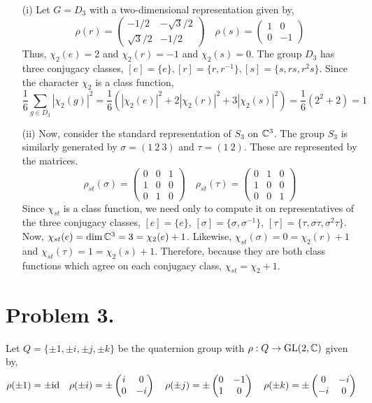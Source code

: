 \documentclass[12pt]{extarticle}
\begin{document}
\begin{enumerate}
\item[(i)] Let $G = D_3$ with a two-dimensional representation given by,
\[ \rho(r) = 
\begin{pmatrix}
-1/2 & -\sqrt{3}/2 \\
\sqrt{3}/2 & -1/2
\end{pmatrix} 
\quad 
\rho(s) = 
\begin{pmatrix}
1 & 0 \\
0 & -1
\end{pmatrix} 
\]
Thus, $\chi_2(e) = 2$ and $\chi_2(r) = -1$ and $\chi_2(s) = 0$.
The group $D_3$ has three conjugacy classes, $[e] = \{e\}, [r] = \{r, r^{-1}\}, [s] = \{s, rs, r^2 s\}$. Since the character $\chi_2$ is a class function,
\[ \frac{1}{6} \sum_{g \in D_3} |\chi_2(g)|^2 = \frac{1}{6} \left( |\chi_2(e)|^2 + 2 |\chi_2(r)|^2 + 3 |\chi_2(s)|^2 \right) = \frac{1}{6} \left( 2^2 + 2 \right) = 1\] 

\item[(ii)]
Now, consider the standard representation of $S_3$ on $\mathbb{C}^3$. The group $S_3$ is similarly generated by $\sigma = (1 \: 2 \: 3)$ and $\tau = (1\: 2)$. These are represented by the matrices.
\[ \rho_{st}(\sigma) = 
\begin{pmatrix}
0 & 0 & 1 \\
1 & 0 & 0 \\
0 & 1 & 0
\end{pmatrix} 
\quad 
\rho_{st}(\tau) = 
\begin{pmatrix}
0 & 1 & 0 \\
1 & 0 & 0 \\
0 & 0 & 1
\end{pmatrix} 
\]
Since $\chi_{st}$ is a class function, we need only to compute it on representatives of the three conjugacy classes, $[e] = \{e\}$, $[\sigma] = \{ \sigma, \sigma^{-1} \}$, $[\tau] = \{ \tau, \sigma \tau, \sigma^2 \tau \}$. Now, $\chi_{st}(e) = \dim{\mathbb{C}^3} = 3 = \chi_2(e) + 1$. Likewise, $\chi_{st}(\sigma) = 0 = \chi_2(r) + 1$ and $\chi_{st}(\tau) = 1 = \chi_2(s) + 1$. Therefore, because they are both class functions which agree on each conjugacy class, $\chi_{st} = \chi_2 + 1$.   
\end{enumerate}

\section*{Problem 3.}

Let $Q = \{\pm 1, \pm i, \pm j, \pm k\}$ be the quaternion group with $\rho : Q \to \mathrm{GL}(2, \mathbb{C})$ given by,
\[ \rho(\pm 1) = \pm \mathrm{id} \quad
\rho(\pm i) = \pm 
\begin{pmatrix}
i & 0 \\
0 & -i
\end{pmatrix} 
\quad 
\rho(\pm j) = \pm 
\begin{pmatrix}
0 & -1 \\
1 & 0
\end{pmatrix} 
\quad
\rho(\pm k) = \pm 
\begin{pmatrix}
0 & -i \\
-i & 0
\end{pmatrix} 
\]
\end{document}
